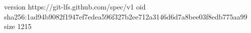 version https://git-lfs.github.com/spec/v1
oid sha256:1ad94b9082f1947ef7edea596f327b2ee712a3146d6d7a8bee03f8edb775aa99
size 1215
